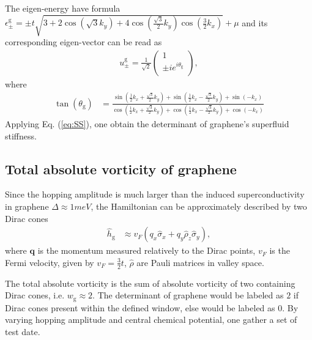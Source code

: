 \documentclass{article}
\begin{document}
The eigen-energy have formula $ \epsilon^{\textrm{g}}_\pm = \pm t \sqrt{3+2 \cos(\sqrt{3} k_y )+4 \cos(\frac{\sqrt{3}}{2}k_y ) \cos(\frac{3}{2}k_x)} + \mu  $ and its corresponding eigen-vector can be read as 
\begin{align}
    u^{\textrm{g}}_\pm = \frac{1}{\sqrt{2} } \left(\begin{array}{c}
         1 \\
         \pm i e^{i \theta_{\textrm{g}} } \\
    \end{array}\right),
\end{align}
where
\begin{align}
    \tan(\theta_{\textrm{g}} ) &= \frac{\sin(\frac{1}{2}k_x + \frac{\sqrt{3}}{2} k_y )+ \sin(\frac{1}{2}k_x - \frac{\sqrt{3}}{2} k_y )+ \sin(-k_x)}{\cos(\frac{1}{2}k_x + \frac{\sqrt{3}}{2} k_y )+ \cos(\frac{1}{2}k_x - \frac{\sqrt{3}}{2} k_{y}  )+ \cos(-k_x)} 
\end{align}
Applying Eq. (\ref{eq:SS}), one obtain the determinant of graphene's superfluid stiffness. 

\subsection{Total absolute vorticity of graphene}
Since the hopping amplitude is much larger than the induced superconductivity in graphene $ \Delta \approx 1meV $, the Hamiltonian can be approximately described by two Dirac cones 
\begin{align}
    \hat{h}_{\textrm{g}} &\approx   v_{F} \left( q_x \hat{\sigma}_x + q_y \hat{\rho}_z \hat{\sigma}_y \right),
\end{align}
where $ \mathbf{q} $ is the momentum measured relatively to the Dirac points, $ v_F $ is the Fermi velocity, given by $ v_F = \frac{3}{2} t $, $ \hat{\rho} $ are Pauli matrices in valley space. 

The total absolute vorticity is the sum of absolute vorticity of two containing Dirac cones, i.e. $ w_{\textrm{g}} \approx 2  $. The determinant of graphene would be labeled as $ 2 $ if Dirac cones present within the defined window, else would be labeled as $ 0 $. By varying hopping amplitude and central chemical potential, one gather a set of test date.
\end{document}
